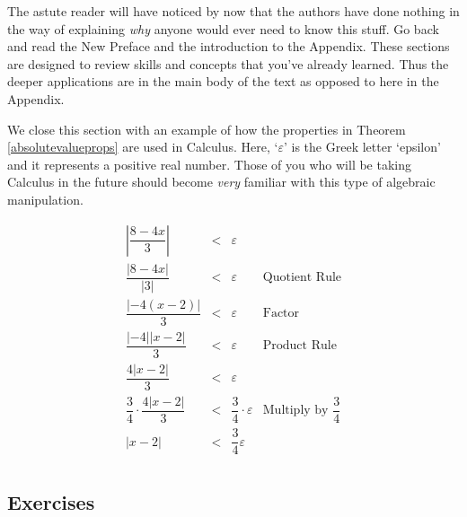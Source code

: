 The astute reader will have noticed by now that the authors have done nothing in the way of explaining \emph{why} anyone would ever need to know this stuff.  Go back and read the New Preface and the introduction to the Appendix.  These sections are designed to review skills and concepts that you've already learned.  Thus the deeper applications are in the main body of the text as opposed to here in the Appendix.  

We close this section with an example of how the properties in Theorem \ref{absolutevalueprops} are used in Calculus.  Here, `$\varepsilon$' is the Greek letter `epsilon' and it represents a positive real number.  Those of you who will be taking Calculus in the future should become \emph{very} familiar with this type of algebraic manipulation.

\[ \begin{array}{rclr}

\left| \dfrac{8-4x}{3} \right| & < & \varepsilon & \\ [12pt]

\dfrac{|8 - 4x|}{|3|} & < & \varepsilon & \text{Quotient Rule}\\ [12pt]

\dfrac{|-4(x-2)|}{3} & < & \varepsilon & \text{Factor} \\ [12pt]

\dfrac{|-4| |x-2|}{3} & < & \varepsilon & \text{Product Rule} \\ [12pt]

\dfrac{4 |x-2|}{3} & < & \varepsilon & \\ [12pt]

\dfrac{3}{4} \cdot \dfrac{4 |x-2|}{3} & < & \dfrac{3}{4} \cdot \varepsilon & \text{Multiply by $\dfrac{3}{4}$} \\ [12pt]

|x -2 | & < & \dfrac{3}{4} \varepsilon & \\  \end{array}\]

\clearpage

\subsection{Exercises}



\closegraphsfile
